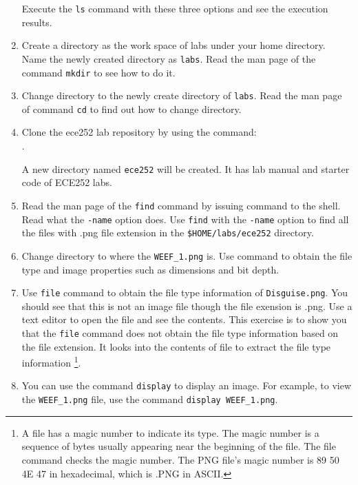 \begin{enumerate}
      Execute  the \verb+ls+ command with these three options and see the execution results.
    \item Create a directory as the work space of labs under your home directory. 
          Name the newly created directory as \verb+labs+.
          Read the man page of the command \verb+mkdir+ to see how to do it.
    \item Change directory to the newly create directory of \verb+labs+.
          Read the man page of command \verb+cd+ to find out how to change directory.
    \item Clone the ece252 lab repository by using the command: \\
      .

      A new directory named \verb+ece252+ will be created. It has lab manual and starter code of ECE252 labs. 
    \item Read the man page of the \verb+find+ command by issuing   
       command to the shell. Read what the \verb+-name+ option does. Use \verb+find+ with the \verb+-name+ option to find all the files with .png file extension in the \verb+$HOME/labs/ece252+ directory.
    \item Change directory to where the \verb+WEEF_1.png+ is. Use  command to obtain the file type and image properties such as dimensions and bit depth.
    \item Use \verb+file+ command to obtain the file type information of \verb+Disguise.png+. You should see that this is not an image file though the file exension is .png.  Use a text editor to open the file and see the contents. This exercise is to show you that the \verb+file+ command does not obtain the file type information based on the file extension. It looks into the contents of file to extract the file type information
      \footnote{A file has a magic number to indicate its type. The magic number is a sequence of bytes usually appearing near the beginning of the file. The file command checks the magic number. The PNG file's magic number is 89 50 4E 47 in hexadecimal, which is .PNG in ASCII.}.
    \item You can use the command \verb+display+ to display an image. For example, to view the \verb+WEEF_1.png+ file, use the command \verb+display WEEF_1.png+. 

\end{enumerate}
